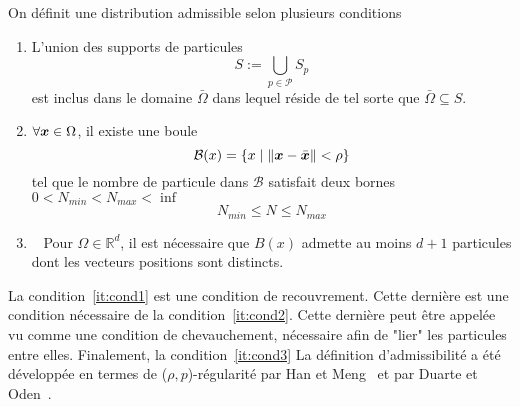 \begin{definition}
    On définit une distribution admissible selon plusieurs conditions
    \begin{enumerate}
        \item L'union des supports de particules~\label{it:cond1}
              \begin{equation*}
                  S:= \bigcup_{p \in \mathcal P} S_p
              \end{equation*}
              est inclus dans le domaine $\bar \Omega$ dans lequel réside de tel sorte que $\bar \Omega	\subseteq S$.
        \item $\forall \bm{x} \in \Omega$, il existe une boule~\label{item:cond2}
              \begin{equation*}
                  \mathcal B(x) = \{x \mid \|\bm{x} - \bar {\bm{x}}\| < \rho\}
              \end{equation*}tel que le nombre de particule dans $\mathcal B$ satisfait deux bornes $0 < N_{min} < N_{max} < \inf$
              \begin{equation*}
                  N_{min} \leq N \leq N_{max}
              \end{equation*}%
              \item~\label{it:cond3} Pour $\Omega \in \mathbb R^d$, il est nécessaire que $B(x)$ admette au moins $d+1$ particules dont les vecteurs positions sont distincts.%
    \end{enumerate}
\end{definition}

La condition~\ref{it:cond1} est une condition de recouvrement. Cette dernière est une condition nécessaire de la condition~\ref{it:cond2}. Cette dernière peut être appelée vu comme une condition de chevauchement, nécessaire afin de "lier" les particules entre elles. Finalement, la condition~\ref{it:cond3}
La définition d'admissibilité a été développée en termes de ($\rho, p$)-régularité par Han et Meng~\cite{HAN20016157} et par Duarte et Oden~\cite{duarte1996hp}.

